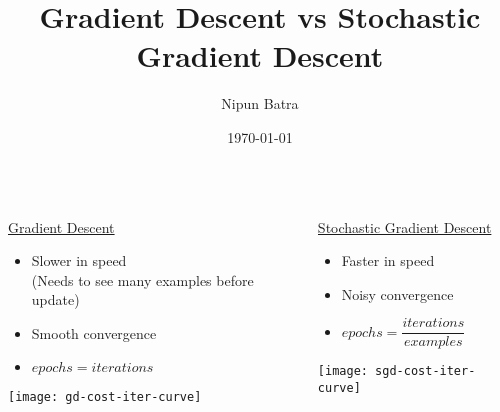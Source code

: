 \documentclass{beamer}
\title{Gradient Descent vs Stochastic Gradient Descent}
\date{\today}
\author{Nipun Batra}
\institute{IIT Gandhinagar}
\begin{document}
	\maketitle

	\begin{frame}{}
\begin{columns}
  \begin{column}{0.5\textwidth}{\underline{Gradient Descent}}
    \begin{itemize}
        \item Slower in speed\\ (Needs to see many examples before update)
	\item Smooth convergence
	\item $epochs = iterations$
    \end{itemize}
	\vspace{0.5cm}
	\centering
	\texttt{[image: gd-cost-iter-curve]}
  \end{column}

  \begin{column}{0.5\textwidth}{\underline{Stochastic Gradient Descent}}
     \begin{itemize}
        \item Faster in speed
	\vspace{0.5cm}
	\item Noisy convergence
	\item $epochs = \dfrac{iterations}{examples}$
     \end{itemize}
	\vspace{0.5cm}
	\centering
	\texttt{[image: sgd-cost-iter-curve]}
  \end{column}
\end{columns}
	\end{frame}
	
\end{document}
